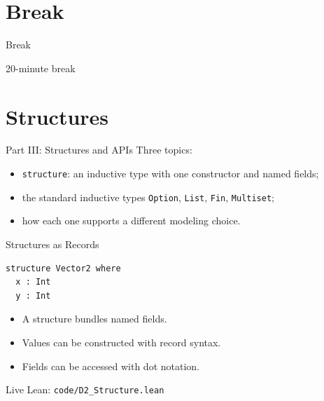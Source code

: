﻿\documentclass[aspectratio=169,11pt]{beamer}
\newcommand{\DTwoPartName}{Overview}
\newcommand{\setDTwoPart}[1]{\gdef\DTwoPartName{#1}}
\newcommand{\leanfile}[1]{\vfill{\small\color{gray}Live Lean: \texttt{#1}}}
\begin{document}
\setDTwoPart{Break}
\section{Break}

\begin{frame}{Break}
  \begin{center}
    \Huge 20-minute break
  \end{center}

  

  
\end{frame}

\setDTwoPart{Part III: Structures and APIs}
\section{Structures}

\begin{frame}{Part III: Structures and APIs}
  \hypertarget{part-structures-apis}{}
  Three topics:

  \begin{itemize}
    \item \texttt{structure}: an inductive type with one constructor and named fields;
    \item the standard inductive types \texttt{Option}, \texttt{List}, \texttt{Fin}, \texttt{Multiset};
    \item how each one supports a different modeling choice.
  \end{itemize}
\end{frame}

\begin{frame}[fragile]{Structures as Records}
  \begin{lstlisting}
structure Vector2 where
  x : Int
  y : Int
  \end{lstlisting}

  \begin{itemize}
    \item A structure bundles named fields.
    \item Values can be constructed with record syntax.
    \item Fields can be accessed with dot notation.
  \end{itemize}

  \leanfile{code/D2\_Structure.lean}
\end{frame}
\end{document}
